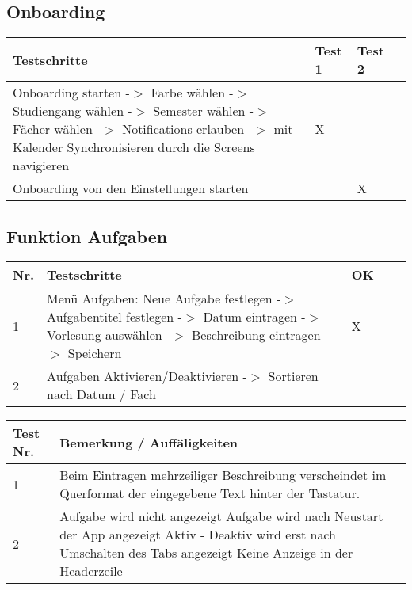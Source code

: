 \subsection{Onboarding}
\noindent%
\begin{tabularx}{\textwidth}{|p{}|X|X|X }
\hline
\textbf{Testschritte} &\textbf{Test 1} &\textbf{Test 2}  \\ \hline 

Onboarding starten -$>$ Farbe wählen -$>$ Studiengang wählen -$>$ Semester wählen -$>$ Fächer wählen -$>$ Notifications erlauben -$>$ mit Kalender Synchronisieren  durch die Screens navigieren & X &    \\ \hline

Onboarding von den Einstellungen starten &  & X   \\ \hline

\end{tabularx}
 \newline
\newline

\subsection{Funktion Aufgaben}

\noindent%
\begin{tabularx}{\textwidth}{|p{}|p{}|X|X|X| }
\hline
\textbf{Nr.} &\textbf{Testschritte} &\textbf{OK}   \\ \hline 
1 & Menü Aufgaben: Neue Aufgabe festlegen -$>$ Aufgabentitel festlegen -$>$ Datum eintragen -$>$ Vorlesung auswählen -$>$ Beschreibung eintragen -$>$ Speichern & X     \\ \hline
2 & Aufgaben Aktivieren/Deaktivieren -$>$ Sortieren nach Datum / Fach &     \\ \hline
\end{tabularx}
 \newline
  \newline

\noindent%
\begin{tabularx}{\textwidth}{|p{}|X|X| }
\hline
\textbf{Test Nr.} &\textbf{Bemerkung / Auffäligkeiten}   \\ \hline 
1 & 
Beim Eintragen mehrzeiliger Beschreibung verscheindet im Querformat der eingegebene Text hinter der Tastatur. \\ \hline

 2 & 
Aufgabe wird nicht angezeigt
Aufgabe wird nach Neustart der App angezeigt
Aktiv - Deaktiv wird erst nach Umschalten des Tabs angezeigt 
Keine Anzeige in der Headerzeile  \\ \hline
\end{tabularx}
\newline
\newline

